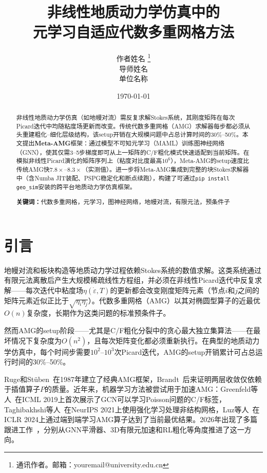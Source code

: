 \documentclass[11pt,a4paper]{ctexart}
\title{\bfseries 非线性地质动力学仿真中的\\元学习自适应代数多重网格方法}
\author{作者姓名%
\thanks{通讯作者。邮箱：youremail@university.edu.cn}\\
导师姓名\\
单位名称}
\date{\today}
\begin{document}
\maketitle

\begin{abstract}
非线性地质动力学仿真（如地幔对流）需反复求解Stokes系统，其刚度矩阵在每次Picard迭代中均随粘度场更新而改变。传统代数多重网格（AMG）求解器每步都必须从头重建粗化--细化层级结构，该setup开销在大规模问题中占总计算时间的30\%--50\%。本文提出\textbf{Meta-AMG}框架：通过模型不可知元学习（MAML）训练图神经网络（GNN），使其仅需3--5步梯度即可从上一矩阵的C/F粗化模式快速适配到当前矩阵。在模拟非线性Picard演化的矩阵序列上（粘度对比度最高$10^6$），Meta-AMG的setup速度比传统AMG快$7.8\times$--$8.3\times$（实测值）。进一步将Meta-AMG集成到完整的块Stokes求解器中（含Numba JIT装配、PSPG稳定化和断点续跑），构建了可通过\texttt{pip install geo\_sim}安装的跨平台地质动力学仿真框架。

\noindent\textbf{关键词：}代数多重网格，元学习，图神经网络，地幔对流，有限元法，预条件子
\end{abstract}

\section{引言}
\label{sec:intro}

地幔对流和板块构造等地质动力学过程依赖Stokes系统的数值求解。这类系统通过有限元法离散后产生大规模稀疏线性方程组，并必须在非线性Picard迭代中反复求解——每次迭代中粘度场$\eta(\dot{\varepsilon}, T)$的更新都会改变刚度矩阵元素（节点$i$和$j$之间的矩阵元素近似正比于$\sqrt{\eta_i \eta_j}$）。代数多重网格（AMG）以其对椭圆型算子的近最优$O(n)$复杂度，长期作为这类问题的标准预条件子。

然而AMG的setup阶段——尤其是C/F粗化分裂中的贪心最大独立集算法——在最坏情况下复杂度为$O(n^2)$，且每次矩阵变化都必须重新执行。在典型的地质动力学仿真中，每个时间步需要$10^2$--$10^3$次Picard迭代，AMG的setup开销累计可占总运行时间的30\%--50\%。

Ruge和St\"{u}ben~\cite{ruge1987}在1987年建立了经典AMG框架，Brandt~\cite{brandt1986}后来证明两层收敛仅依赖于插值算子$P$的质量。近年来，机器学习方法被尝试用于加速AMG：Greenfeld等人~\cite{greenfeld2019}在ICML 2019上首次展示了GCN可以学习Poisson问题的C/F标签，Taghibakhshi等人~\cite{taghibakhshi2021}在NeurIPS 2021上使用强化学习处理非结构网格，Luz等人~\cite{luz2024}在ICLR 2024上通过端到端学习AMG算子达到了当前最优结果。2026年出现了多篇跟进工作~\cite{chillon2026,goik2026,fink2026,yusuf2026}，分别从GNN平滑器、3D有限元加速和RL粗化等角度推进了这一方向。
\end{document}
